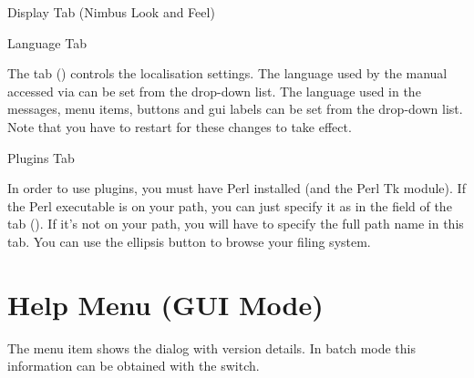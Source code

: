  {%
 }
 {Display Tab (Nimbus Look and Feel)}


 {%
 }
 {Language Tab}


The  tab () controls the localisation settings.
The language used by the manual accessed via 
can be set from the  drop-down 
list. The language used in the messages, menu items, buttons and 
\gls{gui} labels can be set from the 
 drop-down 
list. Note that you have to restart  for these changes to take 
effect.



 {%
 }
 {Plugins Tab}

In order to use  plugins, you must have Perl installed (and the
Perl Tk module). If the Perl executable is on your path, you can just
specify it as  in the 
field of the  tab (). If it's not on your
path, you will have to specify the full path name in this tab. You can
use the ellipsis button to browse your filing system.

\chapter{Help Menu (GUI Mode)}
\label{sec:helpwindows}


The  menu item shows the 
dialog with version details. In batch mode this information can be
obtained with the  switch.




